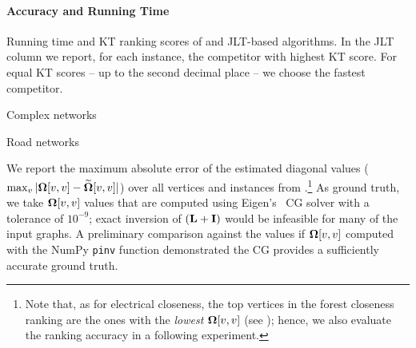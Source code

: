\paragraph{Accuracy and Running Time}
\begin{table}[tb]
\setlength{\tabcolsep}{2pt}
\centering
\footnotesize
\caption{Running time and KT ranking scores of \ust
and JLT-based algorithms. In the JLT column we report,
for each instance, the competitor with highest KT score.
For equal KT scores -- up to the second decimal place --
we choose the fastest competitor.}
\label{tab:el-clos:forest-corr}
\begin{subtable}[t]{.5\textwidth}
\centering
\caption{Complex networks}
\label{tab:el-clos:forest-corr-cplx}

\end{subtable}\hfill
\begin{subtable}[t]{.5\textwidth}
\centering
\caption{Road networks}
\label{tab:el-clos:forest-corr-road}

\end{subtable}
\end{table}

We report the maximum absolute error of the estimated diagonal values
(\ie $\max_v|\bm{\Omega}[v, v] - \widetilde{\bm{\Omega}}[v, v]|$) over all vertices and instances
from .\footnote{Note that, as for electrical
closeness, the top vertices in the forest closeness ranking are the ones
with the \emph{lowest} $\bm{\Omega}[v,v]$ (see );
hence, we also evaluate the ranking accuracy in a following experiment.}
%
As ground truth, we take $\bm{\Omega}[v, v]$ values that are computed using
Eigen's~\cite{eigenweb} CG solver with a tolerance of $10^{-9}$;
exact inversion of $(\mathbf{L} + \mathbf{I})$ would be infeasible for many
of the input graphs. A preliminary comparison against the values
if $\bm{\Omega}[v, v]$ computed with the NumPy \texttt{pinv} function
demonstrated the CG provides a sufficiently accurate ground truth.

